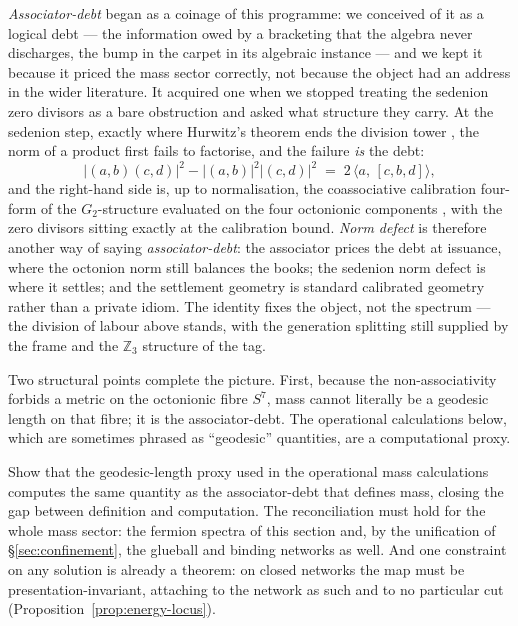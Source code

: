 \emph{Associator-debt} began as a coinage of this programme: we conceived of it
as a logical debt --- the information owed by a bracketing that the algebra
never discharges, the bump in the carpet in its algebraic instance --- and we
kept it because it priced the mass sector correctly, not because the object had
an address in the wider literature. It acquired one when we stopped treating
the sedenion zero divisors as a bare obstruction and asked what structure they
carry. At the sedenion step, exactly where Hurwitz's theorem ends the division
tower \autocite{hurwitz1898}, the norm of a product first fails to factorise,
and the failure \emph{is} the debt:
\begin{equation}
  \bigl\lvert (a,b)(c,d) \bigr\rvert^{2}
  - \bigl\lvert (a,b) \bigr\rvert^{2} \bigl\lvert (c,d) \bigr\rvert^{2}
  \;=\; 2 \,\bigl\langle a,\, [c,b,d] \bigr\rangle ,
  \label{eq:debt-defect}
\end{equation}
and the right-hand side is, up to normalisation, the coassociative calibration
four-form of the $G_2$-structure evaluated on the four octonionic components
\autocite{harvey1982calibrated,bryant1987exceptional}, with the zero divisors
sitting exactly at the calibration bound. \emph{Norm defect} is therefore
another way of saying \emph{associator-debt}: the associator prices the debt at
issuance, where the octonion norm still balances the books; the sedenion norm
defect is where it settles; and the settlement geometry is standard calibrated
geometry rather than a private idiom. The identity fixes the object, not the
spectrum --- the division of labour above stands, with the generation splitting
still supplied by the frame and the $\mathbb{Z}_3$ structure of the tag.

Two structural points complete the picture. First, because the non-associativity forbids a metric on
the octonionic fibre $S^7$, mass cannot literally be a geodesic length on that fibre; it is the
associator-debt. The operational calculations below, which are sometimes phrased as ``geodesic''
quantities, are a computational proxy.

\begin{openproblem}\label{op:associator-geodesic}
Show that the geodesic-length proxy used in the operational mass calculations computes the same
quantity as the associator-debt that defines mass, closing the gap between definition and
computation. The reconciliation must hold for the whole mass sector: the fermion spectra of this
section and, by the unification of \S\ref{sec:confinement}, the glueball and binding networks as
well. And one constraint on any solution is already a theorem: on closed networks the map must be
presentation-invariant, attaching to the network as such and to no particular cut
(Proposition~\ref{prop:energy-locus}).
\end{openproblem}

